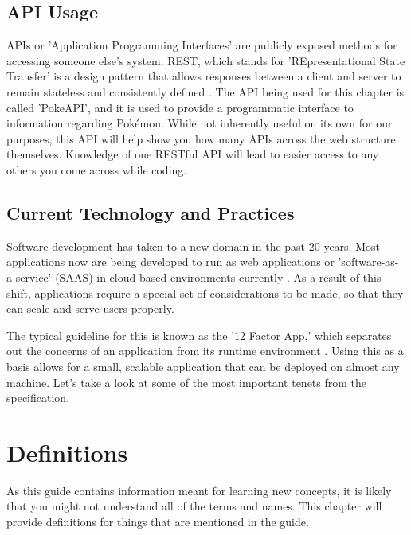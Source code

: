 \documentclass[12pt, oneside, a4paper]{book}
\begin{document}
      \section{API Usage}
      APIs or 'Application Programming Interfaces' are publicly exposed methods for accessing someone else's system.
      REST, which stands for 'REpresentational State Transfer' is a design pattern that allows responses between a client and server to remain stateless and consistently defined \autocite{hallettPokeAPI}.
      The API being used for this chapter is called 'PokeAPI', and it is used to provide a programmatic interface to information regarding Pokémon.
      While not inherently useful on its own for our purposes, this API will help show you how many APIs across the web structure themselves.
      Knowledge of one RESTful API will lead to easier access to any others you come across while coding.

      \section{Current Technology and Practices}
      Software development has taken to a new domain in the past 20 years.
      Most applications now are being developed to run as web applications or 'software-as-a-service' (SAAS) in cloud based environments currently \autocite{WhatCloudComputing}.
      As a result of this shift, applications require a special set of considerations to be made, so that they can scale and serve users properly.

      The typical guideline for this is known as the '12 Factor App\footnotemark,' which separates out the concerns of an application from its runtime environment \autocite{wigginsTwelveFactorApp2017}.
      Using this as a basis allows for a small, scalable application that can be deployed on almost any machine.
      Let's take a look at some of the most important tenets from the specification.

   \chapter*{Definitions}
   \label{chap:definitions}
      As this guide contains information meant for learning new concepts, it is likely that you might not understand all of the terms and names.
      This chapter will provide definitions for things that are mentioned in the guide.

\newpage
{}
\printbibliography[title={Works Cited},heading=bibintoc]
\end{document}
